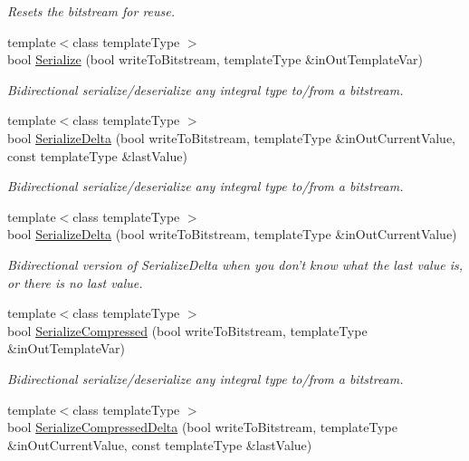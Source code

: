 \begin{DoxyCompactItemize}
\begin{DoxyCompactList}\small\item\em Resets the bitstream for reuse. \end{DoxyCompactList}\item 
{\footnotesize template$<$class template\-Type $>$ }\\bool \hyperlink{class_rak_net_1_1_bit_stream_adf95af1e57ce9a5386ab6a620ffd593b}{Serialize} (bool write\-To\-Bitstream, template\-Type \&in\-Out\-Template\-Var)
\begin{DoxyCompactList}\small\item\em Bidirectional serialize/deserialize any integral type to/from a bitstream. \end{DoxyCompactList}\item 
{\footnotesize template$<$class template\-Type $>$ }\\bool \hyperlink{class_rak_net_1_1_bit_stream_a6aab79184deb91907b7bc8934ca45bc2}{Serialize\-Delta} (bool write\-To\-Bitstream, template\-Type \&in\-Out\-Current\-Value, const template\-Type \&last\-Value)
\begin{DoxyCompactList}\small\item\em Bidirectional serialize/deserialize any integral type to/from a bitstream. \end{DoxyCompactList}\item 
{\footnotesize template$<$class template\-Type $>$ }\\bool \hyperlink{class_rak_net_1_1_bit_stream_ab1cc6838ab5b4477ac7a4021bb1356c3}{Serialize\-Delta} (bool write\-To\-Bitstream, template\-Type \&in\-Out\-Current\-Value)
\begin{DoxyCompactList}\small\item\em Bidirectional version of Serialize\-Delta when you don't know what the last value is, or there is no last value. \end{DoxyCompactList}\item 
{\footnotesize template$<$class template\-Type $>$ }\\bool \hyperlink{class_rak_net_1_1_bit_stream_a5fdf11345fb4e998d411b87426648a36}{Serialize\-Compressed} (bool write\-To\-Bitstream, template\-Type \&in\-Out\-Template\-Var)
\begin{DoxyCompactList}\small\item\em Bidirectional serialize/deserialize any integral type to/from a bitstream. \end{DoxyCompactList}\item 
{\footnotesize template$<$class template\-Type $>$ }\\bool \hyperlink{class_rak_net_1_1_bit_stream_a8a1991ab41173693f8e9c0e78c9ad2a3}{Serialize\-Compressed\-Delta} (bool write\-To\-Bitstream, template\-Type \&in\-Out\-Current\-Value, const template\-Type \&last\-Value)

\end{DoxyCompactItemize}
